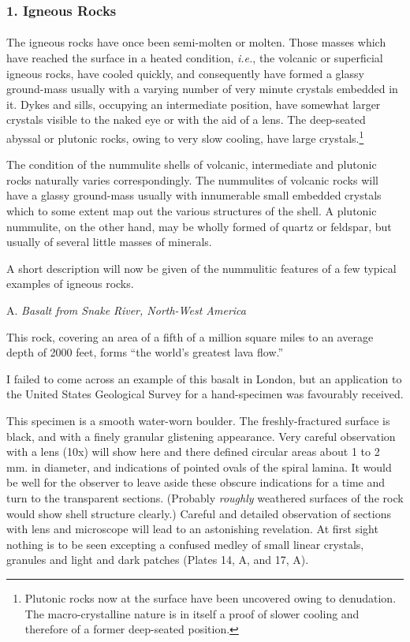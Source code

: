 \documentclass[a4paper, 12pt, oneside]{article}
\begin{document}
\subsubsection{1. Igneous Rocks}
\paragraph{}
The igneous rocks have once been semi-molten or molten. Those masses which have reached the surface in a heated condition, \emph{i.e.}, the volcanic or superficial igneous rocks, have cooled quickly, and consequently have formed a glassy ground-mass usually with a varying number of very minute crystals embedded in it. Dykes and sills, occupying an intermediate position, have somewhat larger crystals visible to the naked eye or with the aid of a lens. The deep-seated abyssal or plutonic rocks, owing to very slow cooling, have large crystals.\footnote{Plutonic rocks now at the surface have been uncovered owing to denudation. The macro-crystalline nature is in itself a proof of slower cooling and therefore of a former deep-seated position.}

The condition of the nummulite shells of volcanic, intermediate and plutonic rocks naturally varies correspondingly. The nummulites of volcanic rocks will have a glassy ground-mass usually with innumerable small embedded crystals which to some extent map out the various structures of the shell. A plutonic nummulite, on the other hand, may be wholly formed of quartz or feldspar, but usually of several little masses of minerals.

A short description will now be given of the nummulitic features of a few typical examples of igneous rocks.

\bigskip
\centerline{A. \emph{Basalt from Snake River, North-West America}}

This rock, covering an area of a fifth of a million square miles to an average depth of 2000 feet, forms ``the world's greatest lava flow.''

I failed to come across an example of this basalt in London, but an application to the United States Geological Survey for a hand-specimen was favourably received.

This specimen is a smooth water-worn boulder. The freshly-fractured surface is black, and with a finely granular glistening appearance. Very careful observation with a lens (10x) will show here and there defined circular areas about 1 to 2 mm. in diameter, and indications of pointed ovals of the spiral lamina. It would be well for the observer to leave aside these obscure indications for a time and turn to the transparent sections. (Probably \emph{roughly} weathered surfaces of the rock would show shell structure clearly.) Careful and detailed observation of sections with lens and microscope will lead to an astonishing revelation. At first sight nothing is to be seen excepting a confused medley of small linear crystals, granules and light and dark patches (Plates 14, A, and 17, A).
\end{document}
